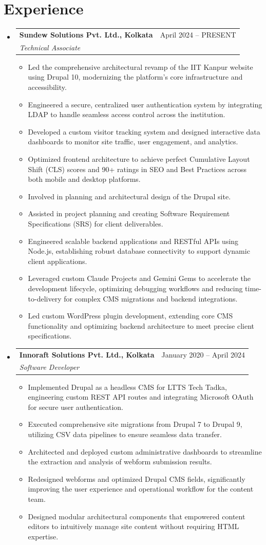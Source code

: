 \documentclass[a4paper,10pt]{article}
\makeatletter
\newcommand{\resumeItem}[1]{\item\small{#1}}
\newcommand{\resumeSubheading}[4]{
  \vspace{-1pt}\item
    \begin{tabular*}{1.0\textwidth}[t]{l@{\extracolsep{\fill}}r}
      \textbf{#1} & #2 \\
      \textit{\small#3} & \textit{\small #4} \\
    \end{tabular*}\vspace{-5pt}
}
\makeatother
\begin{document}
\section{Experience}
\begin{itemize}[leftmargin=0.15in, label={}]
  \resumeSubheading
    {Sundew Solutions Pvt. Ltd., Kolkata}{April 2024 -- PRESENT}
    {Technical Associate}{}
    \begin{itemize}[leftmargin=0.15in]
        \resumeItem{Led the comprehensive architectural revamp of the IIT Kanpur website using Drupal 10, modernizing the platform's core infrastructure and accessibility.}
        \resumeItem{Engineered a secure, centralized user authentication system by integrating LDAP to handle seamless access control across the institution.}
        \resumeItem{Developed a custom visitor tracking system and designed interactive data dashboards to monitor site traffic, user engagement, and analytics.}
        \resumeItem{Optimized frontend architecture to achieve perfect Cumulative Layout Shift (CLS) scores and 90+ ratings in SEO and Best Practices across both mobile and desktop platforms.}
        \resumeItem{Involved in planning and architectural design of the Drupal site.}
        \resumeItem{Assisted in project planning and creating Software Requirement Specifications (SRS) for client deliverables.}
        \resumeItem{Engineered scalable backend applications and RESTful APIs using Node.js, establishing robust database connectivity to support dynamic client applications.}
        \resumeItem{Leveraged custom Claude Projects and Gemini Gems to accelerate the development lifecycle, optimizing debugging workflows and reducing time-to-delivery for complex CMS migrations and backend integrations.}
        \resumeItem{Led custom WordPress plugin development, extending core CMS functionality and optimizing backend architecture to meet precise client specifications.}
    \end{itemize}

  \resumeSubheading
    {Innoraft Solutions Pvt. Ltd., Kolkata}{January 2020 -- April 2024}
    {Software Developer}{}
    \begin{itemize}[leftmargin=0.15in]
        \resumeItem{Implemented Drupal as a headless CMS for LTTS Tech Tadka, engineering custom REST API routes and integrating Microsoft OAuth for secure user authentication.}
        \resumeItem{Executed comprehensive site migrations from Drupal 7 to Drupal 9, utilizing CSV data pipelines to ensure seamless data transfer.}
        \resumeItem{Architected and deployed custom administrative dashboards to streamline the extraction and analysis of webform submission results.}
        \resumeItem{Redesigned webforms and optimized Drupal CMS fields, significantly improving the user experience and operational workflow for the content team.}
        \resumeItem{Designed modular architectural components that empowered content editors to intuitively manage site content without requiring HTML expertise.}
    \end{itemize}
\end{itemize}
\end{document}
